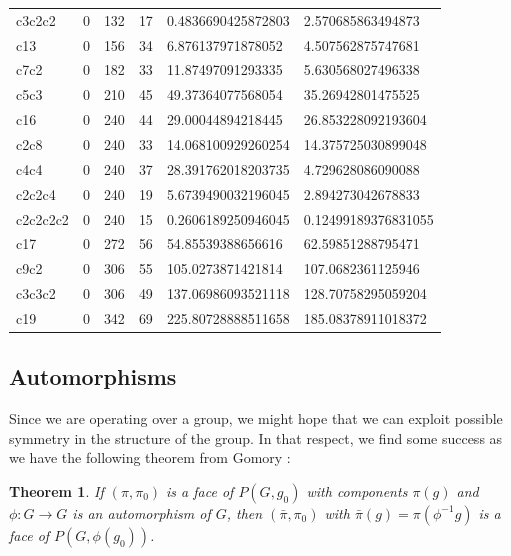\documentclass{article}
\newtheorem{theorem}{Theorem}
\begin{document}
\begin{table}[]
\begin{tabular}{@{}llllll@{}}
			c3c2c2   & 0     & 132            & 17                     & 0.4836690425872803  & 2.570685863494873    \\
			c13      & 0     & 156            & 34                     & 6.876137971878052   & 4.507562875747681    \\
			c7c2     & 0     & 182            & 33                     & 11.87497091293335   & 5.630568027496338    \\
			c5c3     & 0     & 210            & 45                     & 49.37364077568054   & 35.26942801475525    \\
			c16      & 0     & 240            & 44                     & 29.00044894218445   & 26.853228092193604   \\
			c2c8     & 0     & 240            & 33                     & 14.068100929260254  & 14.375725030899048   \\
			c4c4     & 0     & 240            & 37                     & 28.391762018203735  & 4.729628086090088    \\
			c2c2c4   & 0     & 240            & 19                     & 5.6739490032196045  & 2.894273042678833    \\
			c2c2c2c2 & 0     & 240            & 15                     & 0.2606189250946045  & 0.12499189376831055  \\
			c17      & 0     & 272            & 56                     & 54.85539388656616   & 62.59851288795471    \\
			c9c2     & 0     & 306            & 55                     & 105.0273871421814   & 107.0682361125946    \\
			c3c3c2   & 0     & 306            & 49                     & 137.06986093521118  & 128.70758295059204   \\
			c19      & 0     & 342            & 69                     & 225.80728888511658  & 185.08378911018372   \\ \bottomrule
		\end{tabular}
	\end{table}

	\subsection{Automorphisms}
	Since we are operating over a group, we might hope that we can exploit possible symmetry in the structure of the group. In that respect, we find some success as we have the following theorem from Gomory \cite{gomory1969some}:
	\begin{theorem}
		If $(\pi, \pi_0)$ is a face of $P(G, g_0)$ with components $\pi(g)$ and $\phi: G \to G$ is an automorphism of $G$, then $(\bar{\pi}, \pi_0)$ with $\bar{\pi}(g) = \pi(\phi^{-1}g)$ is a face of $P(G, \phi(g_0))$.
	\end{theorem}
\end{document}
